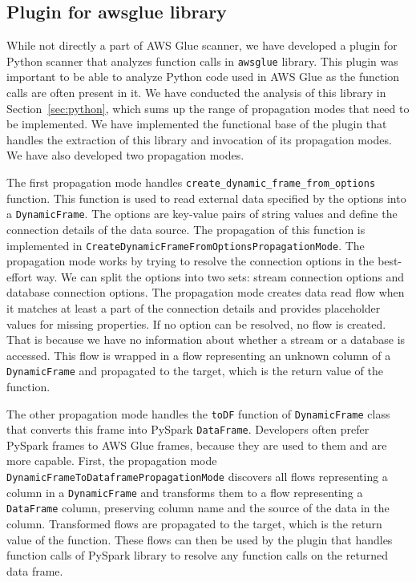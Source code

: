 \subsection{Plugin for awsglue library}
While not directly a part of AWS Glue scanner, we have developed a plugin for Python scanner that analyzes function calls in \texttt{awsglue} library. This plugin was important to be able to analyze Python code used in AWS Glue as the function calls are often present in it. We have conducted the analysis of this library in Section~\ref{sec:python}, which sums up the range of propagation modes that need to be implemented. We have implemented the functional base of the plugin that handles the extraction of this library and invocation of its propagation modes. We have also developed two propagation modes.
\par
The first propagation mode handles \texttt{create\_dynamic\_frame\_from\_options} function. This function is used to read external data specified by the options into a \texttt{DynamicFrame}. The options are key-value pairs of string values and define the connection details of the data source. The propagation of this function is implemented in  \texttt{CreateDynamicFrameFromOptionsPropagationMode}. The propagation mode works by trying to resolve the connection options in the best-effort way. We can split the options into two sets: stream connection options and database connection options. The propagation mode creates data read flow when it matches at least a part of the connection details and provides placeholder values for missing properties. If no option can be resolved, no flow is created. That is because we have no information about whether a stream or a database is accessed. This flow is wrapped in a flow representing an unknown column of a \texttt{DynamicFrame} and propagated to the target, which is the return value of the function.
\par
The other propagation mode handles the \texttt{toDF} function of \texttt{DynamicFrame} class that converts this frame into PySpark \texttt{DataFrame}. Developers often prefer PySpark frames to AWS Glue frames, because they are used to them and are more capable. First, the propagation mode \texttt{DynamicFrameToDataframePropagationMode} discovers all flows representing a column in a \texttt{DynamicFrame} and transforms them to a flow representing a \texttt{DataFrame} column, preserving column name and the source of the data in the column. Transformed flows are propagated to the target, which is the return value of the function. These flows can then be used by the plugin that handles function calls of PySpark library to resolve any function calls on the returned data frame.

 

 